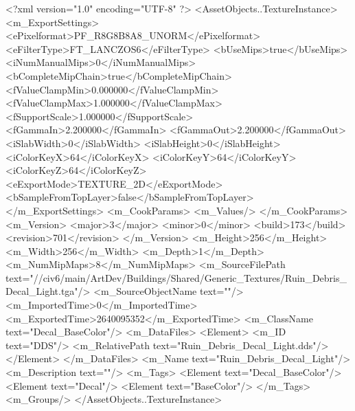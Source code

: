 <?xml version="1.0" encoding="UTF-8" ?>
<AssetObjects..TextureInstance>
	<m_ExportSettings>
		<ePixelformat>PF_R8G8B8A8_UNORM</ePixelformat>
		<eFilterType>FT_LANCZOS6</eFilterType>
		<bUseMips>true</bUseMips>
		<iNumManualMips>0</iNumManualMips>
		<bCompleteMipChain>true</bCompleteMipChain>
		<fValueClampMin>0.000000</fValueClampMin>
		<fValueClampMax>1.000000</fValueClampMax>
		<fSupportScale>1.000000</fSupportScale>
		<fGammaIn>2.200000</fGammaIn>
		<fGammaOut>2.200000</fGammaOut>
		<iSlabWidth>0</iSlabWidth>
		<iSlabHeight>0</iSlabHeight>
		<iColorKeyX>64</iColorKeyX>
		<iColorKeyY>64</iColorKeyY>
		<iColorKeyZ>64</iColorKeyZ>
		<eExportMode>TEXTURE_2D</eExportMode>
		<bSampleFromTopLayer>false</bSampleFromTopLayer>
	</m_ExportSettings>
	<m_CookParams>
		<m_Values/>
	</m_CookParams>
	<m_Version>
		<major>3</major>
		<minor>0</minor>
		<build>173</build>
		<revision>701</revision>
	</m_Version>
	<m_Height>256</m_Height>
	<m_Width>256</m_Width>
	<m_Depth>1</m_Depth>
	<m_NumMipMaps>8</m_NumMipMaps>
	<m_SourceFilePath text="//civ6/main/ArtDev/Buildings/Shared/Generic_Textures/Ruin_Debris_Decal_Light.tga"/>
	<m_SourceObjectName text=""/>
	<m_ImportedTime>0</m_ImportedTime>
	<m_ExportedTime>2640095352</m_ExportedTime>
	<m_ClassName text="Decal_BaseColor"/>
	<m_DataFiles>
		<Element>
			<m_ID text="DDS"/>
			<m_RelativePath text="Ruin_Debris_Decal_Light.dds"/>
		</Element>
	</m_DataFiles>
	<m_Name text="Ruin_Debris_Decal_Light"/>
	<m_Description text=""/>
	<m_Tags>
		<Element text="Decal_BaseColor"/>
		<Element text="Decal"/>
		<Element text="BaseColor"/>
	</m_Tags>
	<m_Groups/>
</AssetObjects..TextureInstance>

